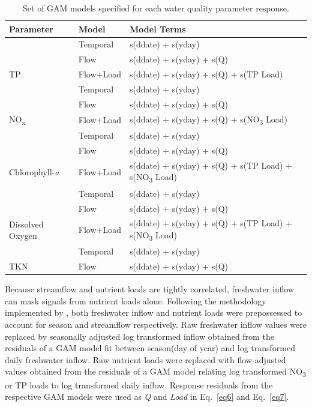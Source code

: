 \documentclass[sn-basic,referee,lineno,pdflatex]{sn-jnl}
\begin{document}
\begin{table}

\caption{\label{tab:table3}Set of GAM models specified for each water quality parameter response.}
\centering
\begin{tabular}[t]{lll}
\toprule
Parameter & Model & Model Terms\\
\midrule
 & Temporal & s(ddate) + s(yday)\\

 & Flow & s(ddate) + s(yday) + s(Q)\\

\multirow{-3}{*}{\raggedright\arraybackslash TP} & Flow+Load & s(ddate) + s(yday) + s(Q) + s(TP Load)\\
\cmidrule{1-3}
 & Temporal & s(ddate) + s(yday)\\

 & Flow & s(ddate) + s(yday) + s(Q)\\

\multirow{-3}{*}{\raggedright\arraybackslash NO\textsubscript{x}} & Flow+Load & s(ddate) + s(yday) + s(Q) + s(NO\textsubscript{3} Load)\\
\cmidrule{1-3}
 & Temporal & s(ddate) + s(yday)\\

 & Flow & s(ddate) + s(yday) + s(Q)\\

\multirow{-3}{*}{\raggedright\arraybackslash Chlorophyll-\textit{a}} & Flow+Load & s(ddate) + s(yday) + s(Q) + s(TP Load) + s(NO\textsubscript{3} Load)\\
\cmidrule{1-3}
 & Temporal & s(ddate) + s(yday)\\

 & Flow & s(ddate) + s(yday) + s(Q)\\

\multirow{-3}{*}{\raggedright\arraybackslash Dissolved Oxygen} & Flow+Load & s(ddate) + s(yday) + s(Q) + s(TP Load) + s(NO\textsubscript{3}  Load)\\
\cmidrule{1-3}
 & Temporal & s(ddate) + s(yday)\\

\multirow{-2}{*}{\raggedright\arraybackslash TKN} & Flow & s(ddate) + s(yday) + s(Q)\\
\bottomrule
\end{tabular}
\end{table}

Because streamflow and nutrient loads are tightly correlated, freshwater
inflow can mask signals from nutrient loads alone. Following the
methodology implemented by
\citet{murphyNutrientImprovementsChesapeake2022}, both freshwater inflow
and nutrient loads were prepossessed to account for season and
streamflow respectively. Raw freshwater inflow values were replaced by
seasonally adjusted log transformed inflow obtained from the residuals
of a GAM model fit between season(day of year) and log transformed daily
freshwater inflow. Raw nutrient loads were replaced with flow-adjusted
values obtained from the residuals of a GAM model relating log
transformed NO\textsubscript{3} or TP loads to log transformed daily
inflow. Response residuals from the respective GAM models were used as
\emph{Q} and \emph{Load} in Eq.~\ref{eq6} and Eq.~\ref{eq7}.
\end{document}

